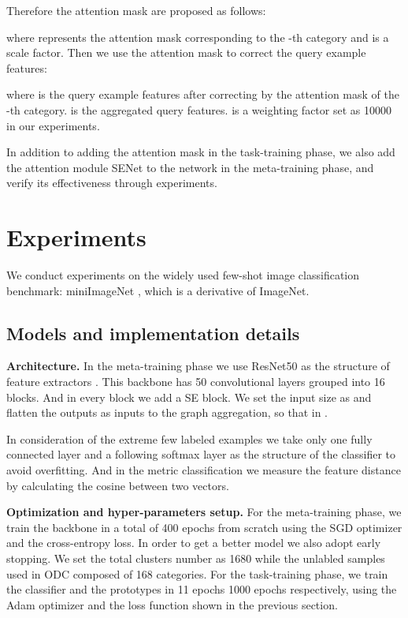 \documentclass[conference]{IEEEtran}
\begin{document}
Therefore the attention mask are proposed as follows:

where  represents the attention mask corresponding to the -th category and  is a scale factor. Then we use the attention mask to correct the query example features:

where  is the query example features after correcting by the attention mask of the -th category.  is the aggregated query features.  is a weighting factor set as 10000 in our experiments.

In addition to adding the attention mask in the task-training phase, we also add the attention module SENet\cite{hu2018squeeze} to the network in the meta-training phase, and verify its effectiveness through experiments.

\section{Experiments}\label{Section 4}

We conduct experiments on the widely used few-shot image classification benchmark: miniImageNet \cite{vinyals2016matching}, which is a derivative of ImageNet. 
\subsection{Models and implementation details}
\textbf{Architecture.} In the meta-training phase we use ResNet50\cite{he2016deep} as the structure of feature extractors . This backbone has 50 convolutional layers grouped into 16 blocks. And in every block we add a SE block. We set the input size as  and flatten the outputs as inputs to the graph aggregation, so that  in .


In consideration of the extreme few labeled examples we take only one fully connected layer and a following softmax layer as the structure of the classifier  to avoid overfitting. And in the metric classification we measure the feature distance by calculating the cosine between two vectors.

\textbf{Optimization and hyper-parameters setup.} For the meta-training phase, we train the backbone in a total of 400 epochs from scratch using the SGD optimizer \cite{bottou2010large} and the cross-entropy loss. In order to get a better model we also adopt early stopping. We set the total clusters number as 1680 while the unlabled samples used in ODC composed of 168 categories. For the task-training phase, we train the classifier and the prototypes in 11 epochs 1000 epochs respectively, using the Adam optimizer \cite{kingma2014adam} and the loss function shown in the previous section. 
\end{document}
